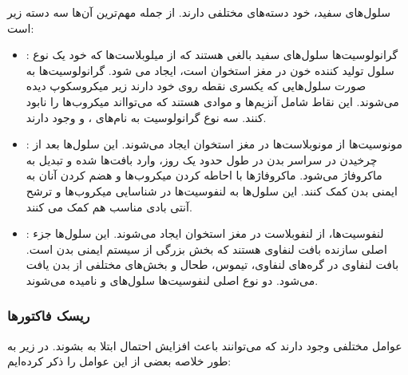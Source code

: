 \documentclass[12pt]{article}
\begin{document}
سلول‌های سفید، خود دسته‌های مختلفی دارند. از جمله مهم‌ترین آن‌ها سه دسته زیر است:

\begin{itemize}
	\item {}: گرانولوسیت‌ها سلول‌های سفید بالغی هستند که از میلوبلاست‌‌ها 
	که خود یک نوع سلول تولید کننده خون در مغز استخوان است، ایجاد می شود. گرانولوسیت‌ها به صورت سلول‌هایی که یکسری نقطه روی خود دارند زیر میکروسکوپ دیده می‌شوند. این نقاط شامل آنزیم‌ها و موادی هستند که می‌توااند میکروب‌‌ها را نابود کنند. سه نوع گرانولوسیت به نام‌های ،  و  وجود دارند.
	
	
	\item {}: مونوسیت‌ها از مونوبلاست‌ها
	در مغز استخوان ایجاد می‌شوند. این سلول‌ها بعد از چرخیدن در سراسر بدن در طول حدود یک روز،‌ وارد بافت‌ها شده و تبدیل به ماکروفاژ
	می‌شود. ماکروفاژ‌ها با احاطه کردن میکروب‌ها و هضم کردن‌ آنان به ایمنی بدن کمک کنند. این سلول‌ها به لنفوسیت‌ها در شناسایی میکروب‌ها و ترشح آنتی بادی مناسب هم کمک می کنند.
	
	\item {}: لنفوسیت‌ها، از لنفوبلاست
	در مغز استخوان ایجاد می‌شوند. این سلول‌ها جزء اصلی سازنده بافت لنفاوی هستند که بخش بزرگی از سیستم ایمنی بدن است. بافت لنفاوی در گره‌های لنفاوی، تیموس، طحال و بخش‌های مختلفی از بدن یافت می‌شود. دو نوع اصلی لنفوسیت‌ها سلول‌های  و  نامیده می‌شوند.
\end{itemize}

 
 
 \subsubsection{ریسک فاکتور‌ها}
 
 عوامل مختلفی وجود دارند که می‌توانند باعث افزایش احتمال ابتلا به  بشوند. در زیر به طور خلاصه بعضی از این عوامل را ذکر کرده‌ایم:
 
\end{document}
